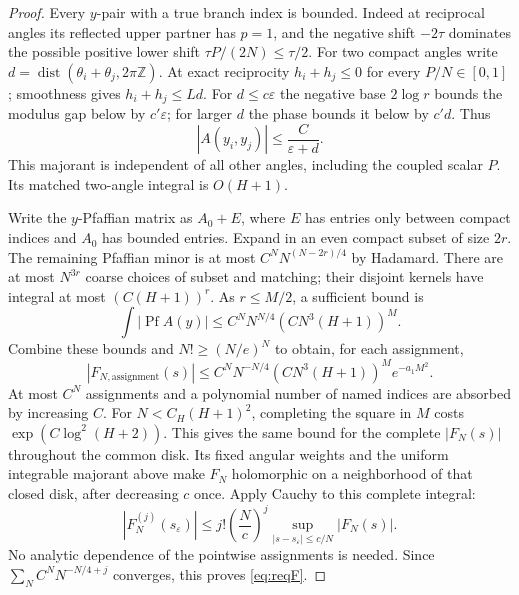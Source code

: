 \documentclass[11pt]{article}
\numberwithin{equation}{section}
\theoremstyle{definition}
\newcommand{\Z}{\mathbb Z}
\newcommand{\eps}{\varepsilon}
\newcommand{\Pf}{\operatorname{Pf}}
\newcommand{\dist}{\operatorname{dist}}
\newcommand{\se}{s_\varepsilon}
\begin{document}
\begin{proof}
Every \(y\)-pair with a true branch index is bounded. Indeed at
reciprocal angles its reflected upper partner has \(p=1\), and
the negative shift \(-2\tau\) dominates the possible positive
lower shift \(\tau P/(2N)\le\tau/2\).
For two compact angles write
\(d=\dist(\theta_i+\theta_j,2\pi\Z)\).
At exact reciprocity \(h_i+h_j\le0\) for every \(P/N\in[0,1]\);
smoothness gives \(h_i+h_j\le Ld\).
For \(d\le c\eps\) the negative base \(2\log r\) bounds the
modulus gap below by \(c'\eps\); for larger \(d\) the phase
bounds it below by \(c'd\). Thus
\[
 |A(y_i,y_j)|\le\frac C{\eps+d}.
\]
This majorant is independent of all other angles, including the
coupled scalar \(P\). Its matched two-angle integral is \(O(H+1)\).

Write the \(y\)-Pfaffian matrix as \(A_0+E\), where \(E\) has entries
only between compact indices and \(A_0\) has bounded entries.
Expand in an even compact subset of size \(2r\). The remaining
Pfaffian minor is at most \(C^N N^{(N-2r)/4}\) by Hadamard.
There are at most \(N^{3r}\) coarse choices of subset and matching;
their disjoint kernels have integral at most \((C(H+1))^r\).
As \(r\le M/2\), a sufficient bound is
\[
 \int|\Pf A(y)|\le C^N N^{N/4}(CN^3(H+1))^M.
 \]
Combine these bounds and \(N!\ge(N/e)^N\) to obtain, for each assignment,
\[
 |F_{N,\mathrm{assignment}}(s)|
 \le C^N N^{-N/4}(CN^3(H+1))^M e^{-a_1M^2}.
 \]
At most \(C^N\) assignments and a polynomial number of named indices
are absorbed by increasing \(C\). For \(N<C_H(H+1)^2\), completing
the square in \(M\) costs \(\exp(C\log^2(H+2))\).
This gives the same bound for the complete \(|F_N(s)|\) throughout
the common disk. Its fixed angular weights and the uniform integrable
majorant above make \(F_N\) holomorphic on a neighborhood of that
closed disk, after decreasing \(c\) once. Apply Cauchy to this complete
integral:
\[
 |F_N^{(j)}(\se)|\le j!\left(\frac Nc\right)^j
       \sup_{|s-\se|\le c/N}|F_N(s)|.
\]
No analytic dependence of the pointwise assignments is needed.
Since \(\sum_N C^N N^{-N/4+j}\) converges, this proves \eqref{eq:reqF}.
\end{proof}



\end{document}
